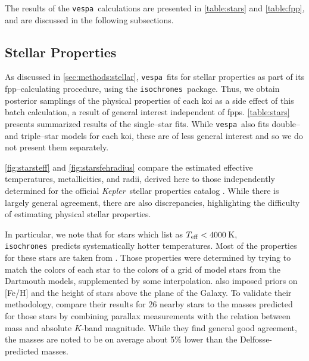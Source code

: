 \documentclass{emulateapj}
\newcommand{\kepler}{\textit{Kepler}}
\newcommand{\vespa}{\texttt{vespa}}
\newcommand{\isochrones}{\texttt{isochrones}}
\begin{document}
The results of the \vespa\ calculations are presented in
\autoref{table:stars} and \autoref{table:fpp}, and are discussed in
the following subsections.



\subsection{Stellar Properties}
\label{sec:results:stars}

As discussed in \autoref{sec:methods:stellar}, \vespa\ fits for stellar
properties as part of its \ac{fpp}--calculating procedure, using the
\isochrones\ package.  Thus, we obtain posterior samplings of the
physical properties of each \ac{koi} as a side effect of this batch
calculation, a result of general interest independent of \acp{fpp}.
\autoref{table:stars} presents summarized results of the single--star
fits.  While \vespa\ also fits double-- and triple--star models for
each \ac{koi}, these are of less general interest and so we do not
present them separately.

\autoref{fig:starsteff} and \autoref{fig:starsfehradius} compare the
estimated effective temperatures, metallicities, and radii, derived
here to those independently determined for the official
\kepler\ stellar properties catalog \citep[][hereafter
  ]{Huber:2014}.  While there is largely
general agreement, there are also discrepancies, highlighting the
difficulty of estimating physical stellar properties.

In particular, we note that for stars which 
list as $T_{\rm eff} < 4000$\,K, \isochrones\ predicts systematically
hotter temperatures.  Most of the  properties
for these stars are taken from
\citet[][]{Dressing:2013}.  Those properties
were determined by trying to match the colors of each star to the colors
of a grid of model stars from the Dartmouth models, supplemented by
some interpolation.   also imposed priors
on [Fe/H] and the height of stars above the plane of the Galaxy.  To
validate their methodology,  compare their
results for 26 nearby stars to the masses predicted for those stars by
combining parallax measurements with the \citet{Delfosse:2000}
relation between mass and absolute $K$-band magnitude.  While they
find general good agreement, the  masses are
noted to be on average about 5\% lower than the Delfosse-predicted masses. 
\end{document}
